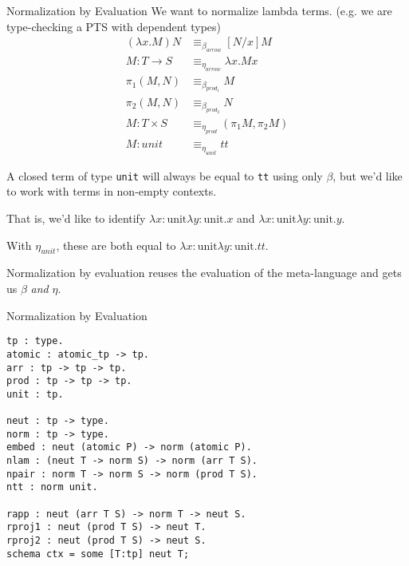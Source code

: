 \documentclass{beamer}
\begin{document}
\begin{frame}[fragile]{Normalization by Evaluation}
We want to normalize lambda terms. (e.g. we are type-checking a PTS with dependent types) 
\begin{align*}
(\lambda x. M) N &\equiv_{\beta_{arrow}} [N/x]M\\
M : T \rightarrow S &\equiv_{\eta_{arrow}} \lambda x. M x\\
\pi_1 (M , N) &\equiv_{\beta_{prod_1}} M\\
\pi_2 (M , N) &\equiv_{\beta_{prod_2}} N\\
M : T \times S &\equiv_{\eta_{prod}} (\pi_1 M, \pi_2 M)\\
M : unit &\equiv_{\eta_{unit}} tt
\end{align*}

A closed term of type {\tt unit} will always be equal to {\tt tt} using only $\beta$, but we'd like to work with terms in non-empty contexts.

That is, we'd like to identify $\lambda x:\text{unit} \lambda y:\text{unit}. x$ and $\lambda x:\text{unit} \lambda y:\text{unit}. y$.

With $\eta_{unit}$, these are both equal to $\lambda x:\text{unit} \lambda y:\text{unit}. tt$.

Normalization by evaluation reuses the evaluation of the meta-language and gets us $\beta$ \emph{and} $\eta$.
\end{frame}

\begin{frame}[fragile]{Normalization by Evaluation}
\begin{lstlisting}
tp : type.
atomic : atomic_tp -> tp.
arr : tp -> tp -> tp.
prod : tp -> tp -> tp.
unit : tp.

neut : tp -> type.
norm : tp -> type.
embed : neut (atomic P) -> norm (atomic P).
nlam : (neut T -> norm S) -> norm (arr T S).
npair : norm T -> norm S -> norm (prod T S).
ntt : norm unit.

rapp : neut (arr T S) -> norm T -> neut S.
rproj1 : neut (prod T S) -> neut T.
rproj2 : neut (prod T S) -> neut S.
schema ctx = some [T:tp] neut T;
\end{lstlisting}
\end{frame}
\end{document}

